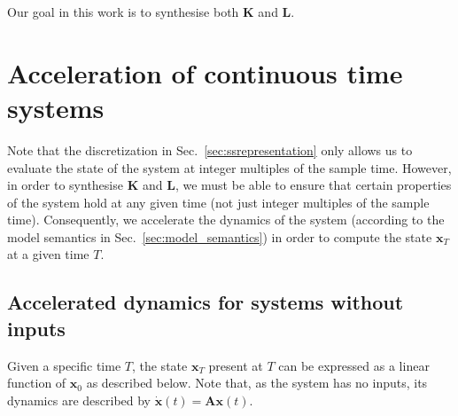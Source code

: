 \documentclass[sigconf]{llncs}
\newcommand{\mat}[1]{\boldsymbol{#1}}
\renewcommand{\vec}[1]{\boldsymbol{#1}}
\begin{document}
 Our goal in this work is to synthesise both $\mat{K}$ and $\mat{L}$.

 \section{Acceleration of continuous time systems}\label{sec:continuous_time_accel}
 
 Note that the discretization in Sec.~\ref{sec:ssrepresentation} only 
 allows us to evaluate the state of the system at integer multiples of the sample time.
 However, in order to synthesise $\mat{K}$ and $\mat{L}$, 
 we must be able to ensure that certain properties of the system hold at any given
 time (not just integer multiples of the sample time).
 Consequently, we accelerate the dynamics of the system (according to the model semantics in Sec.~\ref{sec:model_semantics}) in order to compute the state $\vec{x}_T$  at a given time $T$.
 
 
 \subsection{Accelerated dynamics for systems without inputs}\label{sec:real_discrete_no_inputs}
 Given a specific time $T$, the state $\vec{x}_T$ present at $T$ can be expressed as a linear function of $\vec{x}_0$ as described below. Note that, as the system has no inputs, its dynamics are described by $\dot{\vec{x}}(t)=\mat{A}\vec{x}(t)$.
 
\end{document}
